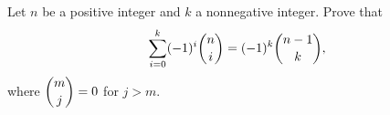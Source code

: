 Let $n$ be a positive integer and $k$ a nonnegative integer. Prove that
\[
\sum_{i=0}^{k}(-1)^i\dbinom ni=(-1)^k\dbinom{n-1}{k},
\]
where $\dbinom{m}{j}=0$ for $j>m$.
